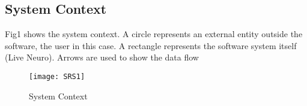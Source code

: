\documentclass[12pt]{article}
\begin{document}
\subsection{System Context}

Fig1 shows the system context. A circle represents an external entity outside
the software, the user in this case. A rectangle represents the software system itself
(Live Neuro). Arrows are used to show the data flow

\begin{figure}[h!]
\begin{center}
 \texttt{[image: SRS1]}
\caption{System Context}
\label{Fig_SystemContext}
\end{center}
\end{figure}

\end{document}
